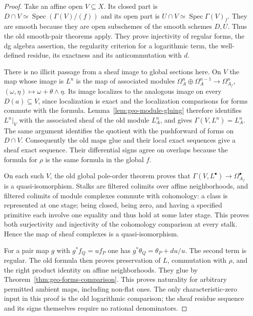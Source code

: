 \documentclass[11pt]{article}
\newcommand{\Spec}{\operatorname{Spec}}
\theoremstyle{definition}
\theoremstyle{remark}
\newcommand{\Om}{\Omega}
\newcommand{\G}{\ensuremath{\Gamma}}
\renewcommand{\Spec}{\ensuremath{\operatorname{Spec}}}
\begin{document}
\begin{proof}
Take an affine open $V\subseteq X$. Its closed part is $D\cap V\simeq\Spec(\G(V)/(f))$ and its open part is $U\cap V\simeq\Spec\G(V)_f$. They are smooth because they are open subschemes of the smooth schemes $D,U$. Thus the old smooth-pair theorems apply. They prove injectivity of regular forms, the dg algebra assertion, the regularity criterion for a logarithmic term, the well-defined residue, its exactness and its anticommutation with $d$.

There is no illicit passage from a sheaf image to global sections here. On $V$ the map whose image is $L^n$ is the map of associated modules
$\Om_A^n\oplus\Om_A^{n-1}\to\Om^n_{A_f}$, $(\omega,\eta)\mapsto\omega+\theta\wedge\eta$.
Its image localizes to the analogous image on every $D(a)\subseteq V$, since localization is exact and the localization comparisons for forms commute with the formula. Lemma~\ref{lem:geo-module-gluing} therefore identifies $L^n|_V$ with the associated sheaf of the old module $L_A^n$, and gives $\G(V,L^n)=L_A^n$. The same argument identifies the quotient with the pushforward of forms on $D\cap V$. Consequently the old maps glue and their local exact sequences give a sheaf exact sequence. Their differential signs agree on overlaps because the formula for $\rho$ is the same formula in the global $f$.

On each such $V$, the old global pole-order theorem proves that $\G(V,L^\bullet)\to\Om^\bullet_{A_f}$ is a quasi-isomorphism. Stalks are filtered colimits over affine neighborhoods, and filtered colimits of module complexes commute with cohomology: a class is represented at one stage; being closed, being zero, and having a specified primitive each involve one equality and thus hold at some later stage. This proves both surjectivity and injectivity of the cohomology comparison at every stalk. Hence the map of sheaf complexes is a quasi-isomorphism.

For a pair map $g$ with $g^*f_Q=u f_P$ one has
$g^*\theta_Q=\theta_P+du/u$. The second term is regular. The old formula then proves preservation of $L$, commutation with $\rho$, and the right product identity on affine neighborhoods. They glue by Theorem~\ref{thm:geo-forms-comparison}. This proves naturality for arbitrary permitted ambient maps, including non-flat ones. The only characteristic-zero input in this proof is the old logarithmic comparison; the sheaf residue sequence and its signs themselves require no rational denominators.
\end{proof}
\end{document}
